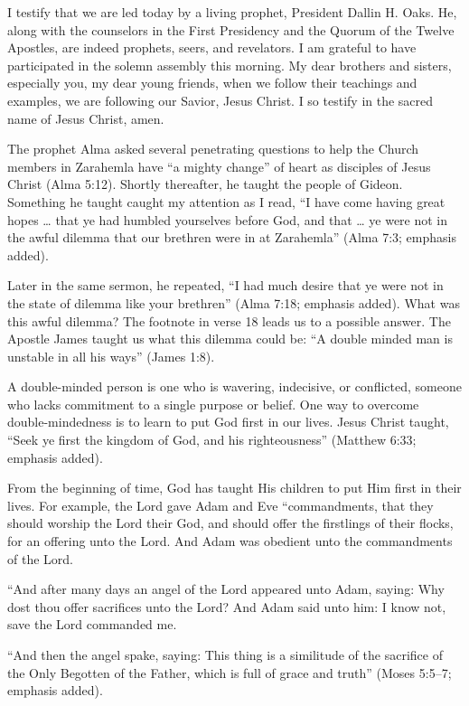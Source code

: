 \documentclass[letterpaper, 11pt]{report}
\newcommand{\speaker}{}
\newcommand{\talk}{}
\newcommand{\talkdatestr}{}
\newcommand{\setspeaker}[1]{\renewcommand{\speaker}{#1}}
\newcommand{\settalk}[1]{\renewcommand{\talk}{#1}}
\newcommand{\talkheading}[2]{%
    \vspace{1em}
    \noindent{\huge\bfseries #1}
    \par\nopagebreak\vspace{0.25em}
    \noindent{\normalsize\bfseries #2\ifx\talkdatestr\empty\else,\ \talkdatestr\fi}
    \par\nopagebreak\vspace{0.5em}
}
\begin{document}
I testify that we are led today by a living prophet, President Dallin H. Oaks. He, along with the counselors in the First Presidency and the Quorum of the Twelve Apostles, are indeed prophets, seers, and revelators. I am grateful to have participated in the solemn assembly this morning. My dear brothers and sisters, especially you, my dear young friends, when we follow their teachings and examples, we are following our Savior, Jesus Christ. I so testify in the sacred name of Jesus Christ, amen.

\newpage
\settalk{Tithing—Putting God First}
\setspeaker{Jorge T. Becerra}
\talkheading{Tithing—Putting God First}{Jorge T. Becerra}

The prophet Alma asked several penetrating questions to help the Church members in Zarahemla have “a mighty change” of heart as disciples of Jesus Christ (Alma 5:12). Shortly thereafter, he taught the people of Gideon. Something he taught caught my attention as I read, “I have come having great hopes … that ye had humbled yourselves before God, and that … ye were not in the awful dilemma that our brethren were in at Zarahemla” (Alma 7:3; emphasis added).

Later in the same sermon, he repeated, “I had much desire that ye were not in the state of dilemma like your brethren” (Alma 7:18; emphasis added). What was this awful dilemma? The footnote in verse 18 leads us to a possible answer. The Apostle James taught us what this dilemma could be: “A double minded man is unstable in all his ways” (James 1:8).

A double-minded person is one who is wavering, indecisive, or conflicted, someone who lacks commitment to a single purpose or belief. One way to overcome double-mindedness is to learn to put God first in our lives. Jesus Christ taught, “Seek ye first the kingdom of God, and his righteousness” (Matthew 6:33; emphasis added).

From the beginning of time, God has taught His children to put Him first in their lives. For example, the Lord gave Adam and Eve “commandments, that they should worship the Lord their God, and should offer the firstlings of their flocks, for an offering unto the Lord. And Adam was obedient unto the commandments of the Lord.

“And after many days an angel of the Lord appeared unto Adam, saying: Why dost thou offer sacrifices unto the Lord? And Adam said unto him: I know not, save the Lord commanded me.

“And then the angel spake, saying: This thing is a similitude of the sacrifice of the Only Begotten of the Father, which is full of grace and truth” (Moses 5:5–7; emphasis added).
\end{document}
